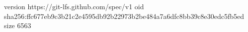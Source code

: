 version https://git-lfs.github.com/spec/v1
oid sha256:ffc677eb9c3b21c2e4595db92b22973b2be484a7a6dfc8bb39c8e30edc5fb5ed
size 6563
